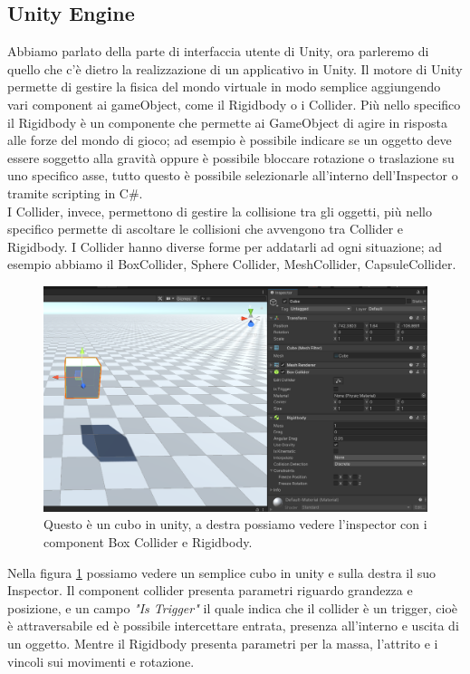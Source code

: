 \documentclass[12pt, openany]{book}
\begin{document}
	\subsection{Unity Engine}
	Abbiamo parlato della parte di interfaccia utente di Unity, ora parleremo di quello che c'è dietro la realizzazione di un applicativo in Unity.
	Il motore di Unity permette di gestire la fisica del mondo virtuale in modo semplice aggiungendo vari component ai gameObject, come il Rigidbody o i Collider. Più nello specifico il Rigidbody è un componente che permette ai GameObject di agire in risposta alle forze del mondo di gioco; ad esempio è possibile indicare se un oggetto deve essere soggetto alla gravità oppure è possibile bloccare rotazione o traslazione su uno specifico asse, tutto questo è possibile selezionarle all'interno dell'Inspector o tramite scripting in C\#.\\
	I Collider, invece, permettono di gestire la collisione tra gli oggetti, più nello specifico permette di ascoltare le collisioni che avvengono tra Collider e Rigidbody. I Collider hanno diverse forme per addatarli ad ogni situazione; ad esempio abbiamo il BoxCollider, Sphere Collider, MeshCollider, CapsuleCollider.
	\begin{figure}[H]
		\centering
		\includegraphics[width=0.8\linewidth]{"Immagini/RigidBody.png"}
		\caption{Questo è un cubo in unity, a destra possiamo vedere l'inspector con i component Box Collider e Rigidbody.}
		\label{fig:Rigidbody}
	\end{figure}
	Nella figura \ref{fig:Rigidbody} possiamo vedere un semplice cubo in unity e sulla destra il suo Inspector. Il component collider presenta parametri riguardo grandezza e posizione, e un campo \emph{"Is Trigger"} il quale indica che il collider è un trigger, cioè è attraversabile ed è possibile intercettare entrata, presenza all'interno e uscita di un oggetto. Mentre il Rigidbody presenta parametri per la massa, l'attrito e i vincoli sui movimenti e rotazione.
\end{document}
